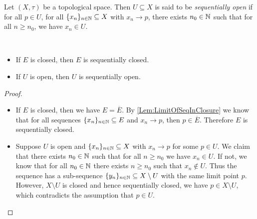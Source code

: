 \documentclass[screen,single]{techreport}
\numberwithin{equation}{section}
\begin{document}
\begin{definition}\label{De:SequentiallyOpen}
	Let $(X,\tau)$ be a topological space.
	Then $U \subseteq X$ is said to be \emph{sequentially open} if for all $p \in U$, for all $\{x_n\}_{n \in \mathbb{N}} \subseteq X$ with $x_n \rightarrow p$, there exists $n_0 \in \mathbb{N}$ such that for all $n \ge n_0$, we have $x_n \in U$.
\end{definition}

\begin{proposition}\label{Prop:ClosedOpenImplySeqClosedOpen}\
	\begin{itemize}
		\item If $E$ is closed, then $E$ is sequentially closed.
		\item If $U$ is open, then $U$ is sequentially open.
	\end{itemize}
\end{proposition}
\begin{proof}\
	\begin{itemize}
		\item If $E$ is closed, then we have $E = \overline{E}$.
		By \cref{Lem:LimitOfSeqInClosure} we know that for all sequences $\{x_n\}_{n \in \mathbb{N}} \subseteq E$ and $x_n \rightarrow p$, then $p \in \overline{E}$.
		Therefore $E$ is sequentially closed.
		
		\item Suppose $U$ is open and $\{x_n\}_{n \in \mathbb{N}} \subseteq X$ with $x_n \rightarrow p$ for some $p \in U$.
		We claim that there exists $n_0 \in \mathbb{N}$ such that for all $n \ge n_0$ we have $x_n \in U$.
		If not, we know that for all $n_0 \in \mathbb{N}$ there exists $n \ge n_0$ such that $x_n \not\in U$.
		Thus the sequence has a sub-sequence $\{y_n\}_{n \in \mathbb{N}} \subseteq X \setminus U$ with the same limit point $p$.
		However, $X \setminus U$ is closed and hence sequentially closed, we have $p \in X \setminus U$, which contradicts the assumption that $p \in U$.
	\end{itemize}
\end{proof}
\end{document}
